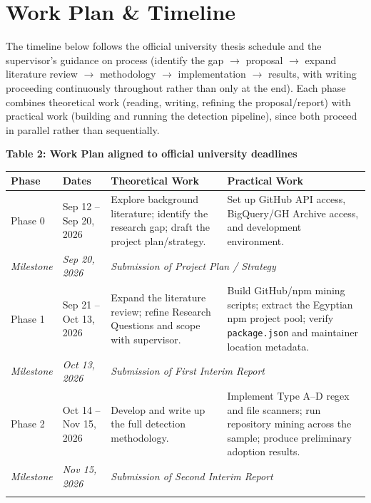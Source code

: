 \documentclass[11pt,a4paper]{article}
\begin{document}
\section{Work Plan \& Timeline}

The timeline below follows the official university thesis schedule and the supervisor's guidance on process (identify the gap $\rightarrow$ proposal $\rightarrow$ expand literature review $\rightarrow$ methodology $\rightarrow$ implementation $\rightarrow$ results, with writing proceeding continuously throughout rather than only at the end). Each phase combines theoretical work (reading, writing, refining the proposal/report) with practical work (building and running the detection pipeline), since both proceed in parallel rather than sequentially.

\newpage
\begin{center}
\textbf{Table 2: Work Plan aligned to official university deadlines}\label{tab:timeline}\\[4pt]
\begin{tabularx}{\textwidth}{@{}l l X X@{}}
\toprule
\textbf{Phase} & \textbf{Dates} & \textbf{Theoretical Work} & \textbf{Practical Work} \\
\midrule
Phase 0 &
Sep 12 -- Sep 20, 2026 &
Explore background literature; identify the research gap; draft the project plan/strategy. &
Set up GitHub API access, BigQuery/GH Archive access, and development environment. \\
\addlinespace
\textit{Milestone} & \textit{Sep 20, 2026} & \multicolumn{2}{l}{\textit{Submission of Project Plan / Strategy}} \\
\addlinespace
Phase 1 &
Sep 21 -- Oct 13, 2026 &
Expand the literature review; refine Research Questions and scope with supervisor. &
Build GitHub/npm mining scripts; extract the Egyptian npm project pool; verify \texttt{package.json} and maintainer location metadata. \\
\addlinespace
\textit{Milestone} & \textit{Oct 13, 2026} & \multicolumn{2}{l}{\textit{Submission of First Interim Report}} \\
\addlinespace
Phase 2 &
Oct 14 -- Nov 15, 2026 &
Develop and write up the full detection methodology. &
Implement Type A--D regex and file scanners; run repository mining across the sample; produce preliminary adoption results. \\
\addlinespace
\textit{Milestone} & \textit{Nov 15, 2026} & \multicolumn{2}{l}{\textit{Submission of Second Interim Report}} \\
\addlinespace

\end{tabularx}
\end{center}
\end{document}
